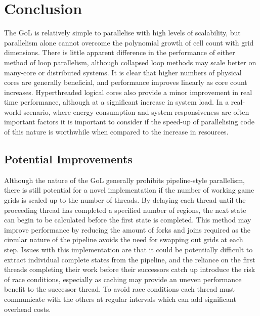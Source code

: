 \documentclass[]{article}
\begin{document}
\section{Conclusion}
The GoL is relatively simple to parallelise with high levels of scalability, but parallelism alone cannot overcome the polynomial growth of cell count with grid dimensions. There is little apparent difference in the performance of either method of loop parallelism, although collapsed loop methods may scale better on many-core or distributed systems. It is clear that higher numbers of physical cores are generally beneficial, and performance improves linearly as core count increases. Hyperthreaded logical cores also provide a minor improvement in real time performance, although at a significant increase in system load. In a real-world scenario, where energy consumption and system responsiveness are often important factors it is important to consider if the speed-up of parallelising code of this nature is worthwhile when compared to the increase in resources.

\subsection{Potential Improvements}
Although the nature of the GoL generally prohibits pipeline-style parallelism, there is still potential for a novel implementation if the number of working game grids is scaled up to the number of threads. By delaying each thread until the proceeding thread has completed a specified number of regions, the next state can begin to be calculated before the first state is completed. This method may improve performance by reducing the amount of forks and joins required as the circular nature of the pipeline avoids the need for swapping out grids at each step. Issues with this implementation are that it could be potentially difficult to extract individual complete states from the pipeline, and the reliance on the first threads completing their work before their successors catch up introduce the risk of race conditions, especially as caching may provide an uneven performance benefit to the successor thread. To avoid race conditions each thread must communicate with the others at regular intervals which can add significant overhead costs.
\end{document}

